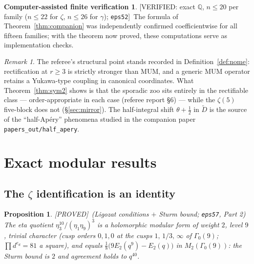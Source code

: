 \documentclass[11pt,reqno]{amsart}
\theoremstyle{plain}
\newtheorem{proposition}[theorem]{Proposition}
\theoremstyle{definition}
\newtheorem{verification}[theorem]{Computer-assisted finite verification}
\theoremstyle{remark}
\newtheorem{remark}[theorem]{Remark}
\newcommand{\Q}{\mathbb{Q}}
\newcommand{\Proved}{\textup{\textsf{[PROVED]}}}
\newcommand{\VerifiedR}[1]{\textup{\textsf{[VERIFIED: #1]}}}
\begin{document}
\begin{verification}\label{ver:companion}
\VerifiedR{exact $\Q$, $n\le20$ per family ($n\le22$ for $\zeta$,
$n\le26$ for $\gamma$); \texttt{eps52}}\ The formula of
Theorem~\ref{thm:companion} was independently confirmed coefficientwise
for all fifteen families; with the theorem now proved, these computations
serve as implementation checks.
\end{verification}

\begin{remark}
The referee's structural point stands recorded in
Definition~\ref{def:nome}: rectification at $r\ge3$ is strictly stronger
than MUM, and a generic MUM operator retains a Yukawa-type coupling in
canonical coordinates. What Theorem~\ref{thm:sym2} shows is that the
sporadic zoo sits entirely in the rectifiable class --- order-appropriate
in each case (referee report \S6) --- while the $\zeta(5)$ five-block does
not (\S\ref{sec:mirror}). The half-integral shift $\theta+\tfrac12$ in
$\widetilde D$ is the source of the ``half-Ap\'ery'' phenomena studied in
the companion paper \texttt{papers\_out/half\_apery}.
\end{remark}

\section{Exact modular results}\label{sec:modular}

\subsection{The $\zeta$ identification is an identity}
\begin{proposition}\label{prop:zetaid}
\Proved\ (Ligozat conditions $+$ Sturm bound; \texttt{eps57}, Part 2)\quad
The eta quotient $\eta_3^{10}/(\eta_1\eta_9)^3$ is a holomorphic modular
form of weight $2$, level $9$, trivial character (cusp orders $0,1,0$ at
the cusps $1,\,1/3,\,\infty$ of $\Gamma_0(9)$; $\prod d^{e_d}=81$ a
square), and equals $\tfrac18\bigl(9E_2(q^9)-E_2(q)\bigr)$ in
$M_2(\Gamma_0(9))$: the Sturm bound is $2$ and agreement holds to
$q^{40}$.
\end{proposition}
\end{document}
